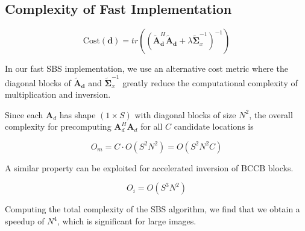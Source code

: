 \documentclass{article}
\begin{document}

\subsection{Complexity of Fast Implementation}

$$
\text{Cost}(\bm{d}) = tr\left(\left( \widetilde{\bm A}_{\bm d}^H \widetilde{\bm
A}_{\bm d} + \lambda \widetilde{\bm \Sigma}_x^{-1} \right)^{-1} \right)
$$

In our fast SBS implementation, we use an alternative cost metric where the
diagonal blocks of $\widetilde{\bm{A}}_{\bm{d}}$ and $\widetilde{\bm \Sigma}_x^{-1}$ greatly
  reduce the computational complexity of multiplication and inversion.

Since each $\bm{A}_d$ has shape $(1 \times S)$ with diagonal blocks of size $N^2$, the overall complexity for
precomputing $\bm{A}^H_d \bm{A}_d$ for all $C$ candidate locations is

$$
O_m = C \cdot O(S^2N^2) = O(S^2N^2C)
$$

A similar property can be exploited for accelerated inversion of BCCB blocks. \cite{kamaci2017}

$$
O_i = O(S^3N^2)
$$

Computing the total complexity of the SBS algorithm, we find that we obtain a
speedup of $N^4$, which is significant for large images.
\end{document}
